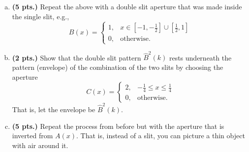 \documentclass[12pt]{article} %
\begin{document}
\begin{problem}
\begin{enumerate}[(a)]
    \item \textbf{(5 pts.)} Repeat the above with a double slit aperture that was made inside the single slit, e.g.,
    \[
    B(x) = \begin{cases} 1, & x\in \left[-1,-\frac{1}{2}\right] \cup \left[\frac{1}{2},1\right] \\
    0, &\textrm{otherwise}.
    \end{cases}
    \]
	\item \textbf{(2 pts.)} Show that the double slit pattern $\hat{B}^2(k)$ rests underneath the pattern (envelope) of the combination of the two slits by choosing the aperture
	\[
	C(x) = \begin{cases} 2, & -\frac{1}{4} \leq x \leq \frac{1}{4}\\
    0, &\textrm{otherwise}.
    \end{cases}
	\]
	That is, let the envelope be $\hat{B}^2(k)$.
	\item \textbf{(5 pts.)} Repeat the process from before but with the aperture that is inverted from $A(x)$. That is, instead of a slit, you can picture a thin object with air around it.
\end{enumerate}
\end{problem}
\end{document}
